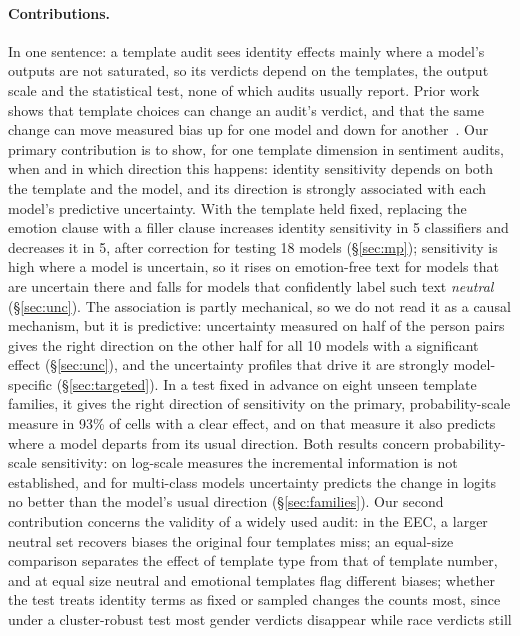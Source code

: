 \documentclass[runningheads]{llncs}
\begin{document}
\paragraph{Contributions.} In one sentence: a template audit sees identity
effects mainly where a model's outputs are not saturated, so its verdicts depend
on the templates, the output scale and the statistical test, none of which
audits usually report. Prior work shows that template choices can change an
audit's verdict, and that the same change can move measured bias up for one
model and down for another~\cite{seshadri2022,selvam2023}. Our primary
contribution is to show, for one template dimension in sentiment audits, when
and in which direction this happens: identity sensitivity depends on both the
template and the model, and its direction is strongly associated with each
model's predictive uncertainty. With the template
held fixed, replacing the emotion clause with a filler clause increases identity
sensitivity in 5 classifiers and decreases it in 5, after correction for
testing 18 models (\S\ref{sec:mp}); sensitivity is high where a model is
uncertain, so it rises on emotion-free text for models that are uncertain there
and falls for models that confidently label such text \emph{neutral}
(\S\ref{sec:unc}). The association is partly mechanical, so we do not read it
as a causal mechanism, but it is predictive: uncertainty measured on half of the
person pairs gives the right direction on the other half for all 10 models with
a significant effect (\S\ref{sec:unc}), and the uncertainty profiles that drive
it are strongly model-specific (\S\ref{sec:targeted}). In a test fixed in
advance on eight unseen template families, it gives the right direction of
sensitivity on the primary, probability-scale measure in 93\% of cells with a
clear effect, and on that measure it also predicts where
a model departs from its usual direction. Both results concern
probability-scale sensitivity: on log-scale measures the incremental
information is not established, and for multi-class models uncertainty
predicts the change in logits no better than the model's usual direction
(\S\ref{sec:families}). Our second contribution concerns the
validity of a widely used audit: in the EEC, a larger neutral set recovers
biases the original four templates miss; an equal-size comparison separates
the effect of template type from that of template number, and at equal size
neutral and emotional templates flag different biases; whether the test treats
identity terms as fixed or sampled changes the counts most, since under a
cluster-robust test most gender verdicts disappear while race verdicts still
\end{document}
